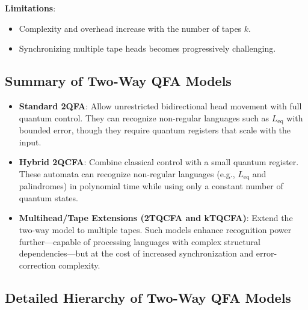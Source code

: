 \textbf{Limitations}:
\begin{itemize}
    \item Complexity and overhead increase with the number of tapes \( k \).
    \item Synchronizing multiple tape heads becomes progressively challenging.
\end{itemize}

\subsection*{Summary of Two-Way QFA Models}
\begin{itemize}
    \item \textbf{Standard 2QFA}: Allow unrestricted bidirectional head movement with full quantum control. They can recognize non-regular languages such as \( L_{\text{eq}} \) with bounded error, though they require quantum registers that scale with the input.
    \item \textbf{Hybrid 2QCFA}: Combine classical control with a small quantum register. These automata can recognize non-regular languages (e.g., \( L_{\text{eq}} \) and palindromes) in polynomial time while using only a constant number of quantum states.
    \item \textbf{Multihead/Tape Extensions (2TQCFA and kTQCFA)}: Extend the two-way model to multiple tapes. Such models enhance recognition power further—capable of processing languages with complex structural dependencies—but at the cost of increased synchronization and error-correction complexity.
\end{itemize}

\subsection*{Detailed Hierarchy of Two-Way QFA Models}
\label{subsec:two-way-hierarchy}

